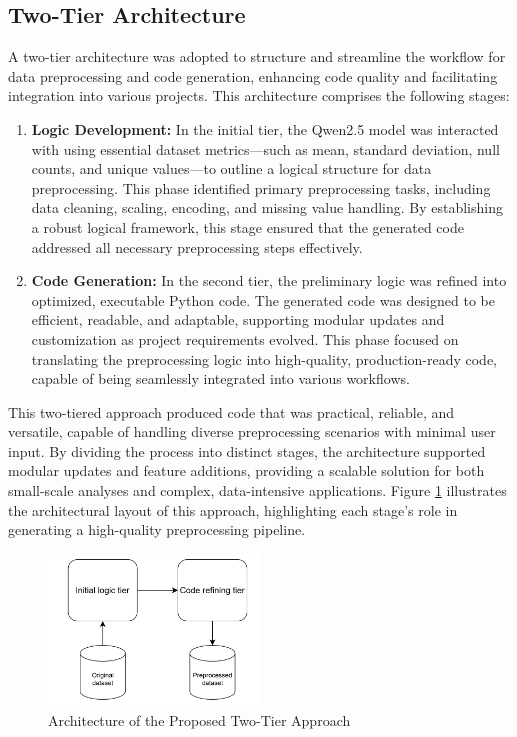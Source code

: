 \subsection{Two-Tier Architecture}
A two-tier architecture was adopted to structure and streamline the workflow for data preprocessing and code generation, enhancing code quality and facilitating integration into various projects. This architecture comprises the following stages:

\begin{enumerate}
    \item \textbf{Logic Development:} In the initial tier, the Qwen2.5 model was interacted with using essential dataset metrics—such as mean, standard deviation, null counts, and unique values—to outline a logical structure for data preprocessing. This phase identified primary preprocessing tasks, including data cleaning, scaling, encoding, and missing value handling. By establishing a robust logical framework, this stage ensured that the generated code addressed all necessary preprocessing steps effectively.
    
    \item \textbf{Code Generation:} In the second tier, the preliminary logic was refined into optimized, executable Python code. The generated code was designed to be efficient, readable, and adaptable, supporting modular updates and customization as project requirements evolved. This phase focused on translating the preprocessing logic into high-quality, production-ready code, capable of being seamlessly integrated into various workflows.
\end{enumerate}

This two-tiered approach produced code that was practical, reliable, and versatile, capable of handling diverse preprocessing scenarios with minimal user input. By dividing the process into distinct stages, the architecture supported modular updates and feature additions, providing a scalable solution for both small-scale analyses and complex, data-intensive applications. Figure \ref{fig:architecture} illustrates the architectural layout of this approach, highlighting each stage's role in generating a high-quality preprocessing pipeline.

\begin{figure}[H]
    \centering
    \includegraphics[width=0.5\textwidth]{media/image.png}
    \caption{Architecture of the Proposed Two-Tier Approach}\label{fig:architecture}
\end{figure}

